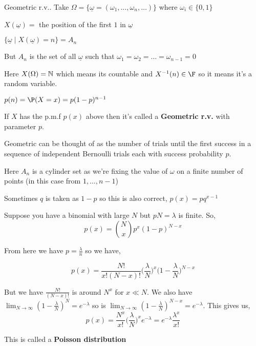 \begin{eg}
    Geometric r.v.. Take $\Omega = \{\underline \omega = (\omega_1, \dots, \omega_n, \dots)\} $ where $\omega_i \in \{0, 1\} $ 

    \vspace{1em}

    $X(\underline \omega) =$ the position of the first  $1$ in $\underline \omega$

    \vspace{1em}

    $\{\underline \omega \mid X(\underline \omega) = n\} = A_n $

    But $A_n$ is the set of all $\underline \omega $ such that  $\omega_1 = \omega_2 = \dots =  \omega_{n - 1} = 0$


    Here $X(\Omega) = \mathbb{N}$ which means its countable and $X^{-1}(n) \in \F$ so it means it's a random variable.

    \vspace{1em}

    $p(n) = \P(X = x) = p(1 -  p)^{n - 1}$


    If $X$ has the p.m.f  $p(x)$ above then it's called a \textbf{Geometric r.v.} with parameter $p$.

\end{eg}
\begin{remark}
	Geometric can be thought of as the number of trials until the first success in a sequence of independent Bernoulli trials each with success probability $p$.
\end{remark}
\begin{remark}
    Here $A_n$ is a cylinder set as we're fixing the value of $\omega$ on a finite number of points (in this case from $1, \dots, n - 1$)
\end{remark}
\begin{remark}
    Sometimes $q$ is taken as $1 - p$ so this is also correct, $p(x) = pq^{x - 1}$ 
\end{remark}


\begin{eg}
    Suppose you have a binomial with large  $N$ but  $pN = \lambda$ is finite. So, 
    $$ p(x) = {N \choose x}p^{x} (1 - p)^{N - x} $$ 

    From here we have $p= \frac{\lambda}{n}$ so we have, 


    $$ p(x) = \frac{N!}{x! (N - x)!} \bigg (\frac{\lambda}{N} \bigg )^{x}\bigg (1 - \frac{\lambda}{N}\bigg )^{N -x }$$ 

    But we have $\frac{N!}{(N - x)!} $ is around $N^{x}$ for $x \ll N$. We also have  $\lim_{N \to \infty} (1 - \frac{\lambda}{N})^{N}= e^{-\lambda}$ so is $\lim_{N \to \infty} (1 - \frac{\lambda}{N})^{N - x} = e^{-\lambda}$. This gives us, 
    $$ p(x) = \frac{N^{x}}{x!} \bigg (\frac{\lambda}{N} \bigg )^{x} e^{-\lambda} = e^{-\lambda} \frac{\lambda ^{x}}{x!}$$ 

    This is called a \textbf{Poisson distribution} 
\end{eg}

